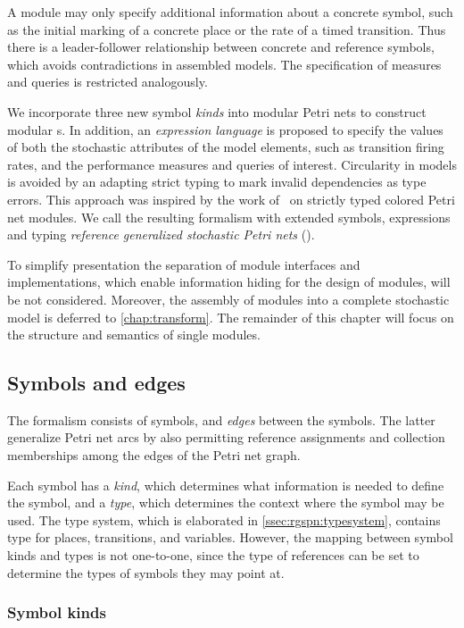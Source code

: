 A module may only specify additional information about a concrete symbol, such as the initial marking of a concrete place or the rate of a timed transition. Thus there is a leader-follower relationship between concrete and reference symbols, which avoids contradictions in assembled models. The specification of measures and queries is restricted analogously.

We incorporate three new symbol \emph{kinds} into modular Petri nets to construct modular s. In addition, an \emph{expression language} is proposed to specify the values of both the stochastic attributes of the model elements, such as transition firing rates, and the performance measures and queries of interest. Circularity in models is avoided by an adapting strict typing to mark invalid dependencies as type errors. This approach was inspired by the work of~\citet{Kindler07modular} on strictly typed colored Petri net modules. We call the resulting formalism with extended symbols, expressions and typing \emph{reference generalized stochastic Petri nets} ().

To simplify presentation the separation of module interfaces and implementations, which enable information hiding for the design of modules, will be not considered. Moreover, the assembly of modules into a complete stochastic model is deferred to \cref{chap:transform}. The remainder of this chapter will focus on the structure and semantics of single  modules.

\subsection{Symbols and edges}

The  formalism consists of symbols, and \emph{edges} between the symbols. The latter generalize Petri net arcs by also permitting reference assignments and collection memberships among the edges of the Petri net graph.

Each symbol has a \emph{kind},  which determines what information is needed to define the symbol, and a \emph{type}, which determines the context where the symbol may be used. The type system, which is elaborated in \vref{ssec:rgspn:typesystem}, contains type for places, transitions, and variables. However, the mapping between symbol kinds and types is not one-to-one, since the type of references can be set to determine the types of symbols they may point at.

\subsubsection{Symbol kinds}

